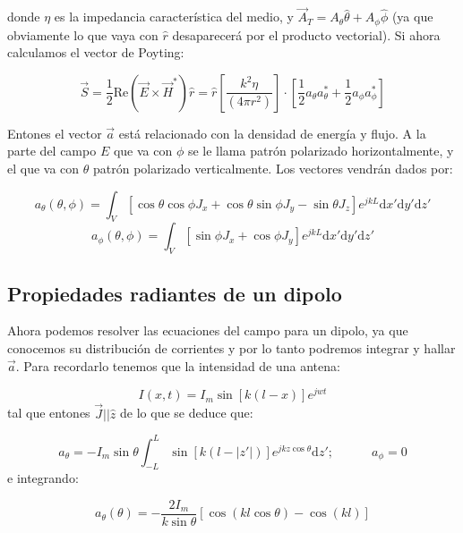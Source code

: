 \documentclass[12pt]{article}
\newcommand{\ccorchetes}[1]{\left[ #1  \right]}
\newcommand{\D}{\mathrm{d}}
\newcommand{\tquad}{\quad \quad \quad}
\begin{document}
donde $\eta$ es la impedancia característica del medio, y $\vec{A}_T = A_\theta \hat{\theta} + A_\phi \hat{\phi}$ (ya que obviamente lo que vaya con $\hat{r}$   desaparecerá por el producto vectorial). Si ahora  calculamos el vector de Poyting:

\begin{equation}
\vec{S} = \dfrac{1}{2} \mathrm{Re} (\vec{E} \times \vec{H}^*) \hat{r} = \hat{r} \ccorchetes{\frac{k^2 \eta}{(4 \pi r^2)}} \cdot \ccorchetes{\dfrac{1}{2} a_{\theta} a_\theta^* + \dfrac{1}{2} a_\phi a_\phi^*} 
\end{equation}

Entones el vector $\vec{a}$ está relacionado con la densidad de energía y flujo. A la parte del campo $E$ que va con $\phi$ se le llama patrón polarizado horizontalmente, y el que va con $\theta$ patrón polarizado verticalmente. Los vectores vendrán dados por:

\begin{equation}
a_\theta (\theta, \phi) = \int_V [\cos \theta \cos \phi J_x + \cos \theta \sin \phi J_y - \sin \theta J_z] e^{jkL} \D x' \D y' \D z'
\end{equation}
\begin{equation}
a_\phi (\theta, \phi) = \int_V [\sin \phi J_x +  \cos \phi J_y ]e^{jkL} \D x' \D y' \D z'
\end{equation}


\subsection{Propiedades radiantes de un dipolo}

Ahora podemos resolver las ecuaciones del campo para un dipolo, ya que conocemos su distribución de corrientes y por lo tanto podremos integrar y hallar $\vec{a}$. Para recordarlo tenemos que la intensidad de una antena:

\begin{equation}
I(x,t) = I_m \sin [k(l-x)] e^{jwt}
\end{equation}
tal que entones $\vec{J} || \hat{z}$ de lo que se deduce que: 

\begin{equation}
a_\theta = - I_m \sin \theta \int_{-L}^L \sin [k (l - |z'|)] e^{jkz \cos \theta} \D z'; \tquad a_\phi=0
 \end{equation}
e integrando:

\begin{equation}
a_\theta(\theta) = - \dfrac{2 I_m}{k \sin \theta} [ \cos (kl \cos \theta) - \cos (kl)]
\end{equation}
\end{document}
